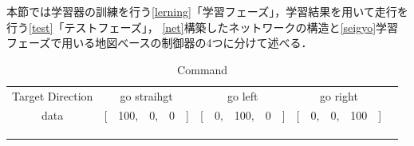 本節では学習器の訓練を行う\ref{lerning}「学習フェーズ」，学習結果を用いて走行を行う\ref{test}「テストフェーズ」，
\ref{net}構築したネットワークの構造と\ref{seigyo}学習フェーズで用いる地図べースの制御器の4つに分けて述べる．
\vspace{2.0zh}
\begin{table}[h]
    \centering
    \caption{Command}
    \begin{tabular}{cccll}
    \cline{1-4}
    \multicolumn{1}{|c|}{Target Direction} & \multicolumn{1}{c|}{go straihgt}          & \multicolumn{1}{c|}{go left}          & \multicolumn{1}{c|}{go right}          &  \\ \cline{1-4}
    \multicolumn{1}{|c|}{data}  & \multicolumn{1}{c|}{{[}　100,　0,　0　{]}} & \multicolumn{1}{c|}{{[}　0,　100,　0　{]}} & \multicolumn{1}{l|}{{[}　0,　0,　100　{]}} &  \\ \cline{1-4}
                               &                                  &                                  &                                  &  \\
                               &                                  &                                  &                                  &  \\
    \multicolumn{1}{l}{}       &                                  &                                  &                                  & 
    \end{tabular}
    \vspace{-3.0zh}
    \label{tb:comman}
    \end{table}

\newpage
